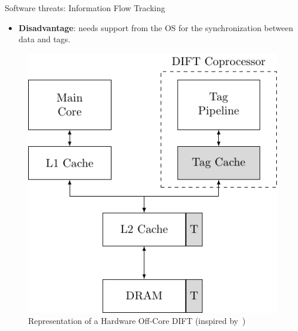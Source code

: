 \begin{frame}{Software threats: Information Flow Tracking}
\begin{minipage}[c]{0.45\textwidth}
        \begin{alertblock}{}
            \begin{itemize}
                [square]
                \justifying
                \item \textbf{Disadvantage}: needs support from the OS for the synchronization between data and tags.
            \end{itemize}
        \end{alertblock}
    \end{minipage}\hfill%
    \begin{minipage}[c]{0.5\textwidth}
        \begin{figure}
            \centering
            \includegraphics[height=.75\textheight]{src/1_introduction/img/offcore.pdf}
            \caption{Representation of a Hardware Off-Core DIFT (inspired by~\cite{KDK-09-dsn})}
            \label{fig:offcore}
        \end{figure}
    \end{minipage}
\end{frame}

